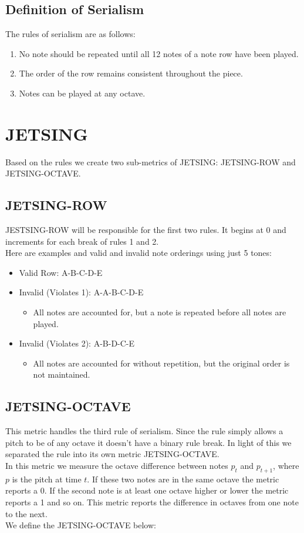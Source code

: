 \documentclass[11pt]{article}
\begin{document}
\subsection{Definition of Serialism}
The rules of serialism are as follows:
\begin{enumerate}
    \item No note should be repeated until all 12 notes of a note row have been played.
    \item The order of the row remains consistent throughout the piece.
    \item Notes can be played at any octave.
\end{enumerate}

\section{JETSING}
Based on the rules we create two sub-metrics of JETSING: JETSING-ROW and JETSING-OCTAVE.

\subsection{JETSING-ROW}
JESTSING-ROW will be responsible for the first two rules. It begins at 0 and increments for each break of rules 1 and 2. 
\\ \indent Here are examples and valid and invalid note orderings using just 5 tones:
\begin{itemize}
    \item Valid Row: A-B-C-D-E 
    \item Invalid (Violates 1): A-A-B-C-D-E
    \begin{itemize}
        \item All notes are accounted for, but a note is repeated before all notes are played.
    \end{itemize}
    \item Invalid (Violates 2): A-B-D-C-E
    \begin{itemize}
        \item All notes are accounted for without repetition, but the original order is not maintained.
    \end{itemize}
\end{itemize}

\subsection{JETSING-OCTAVE}
This metric handles the third rule of serialism. Since the rule simply allows a pitch to be of any octave it doesn't have a binary rule break. In light of this we separated the rule into its own metric JETSING-OCTAVE. 
\\ \indent In this metric we measure the octave difference between notes $p_t$ and $p_{t+1}$, where $p$ is the pitch at time $t$. If these two notes are in the same octave the metric reports a 0. If the second note is at least one octave higher or lower the metric reports a 1 and so on. This metric reports the difference in octaves from one note to the next.
\\ \indent We define the JETSING-OCTAVE below:
\end{document}
